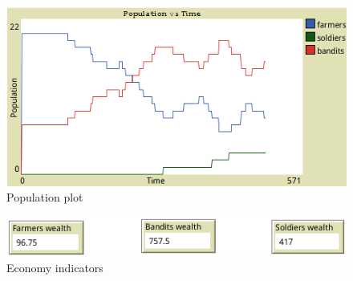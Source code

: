 \documentclass{wscpaperproc}
\begin{document}
\begin{figure}[h!]
    \centering
    \includegraphics[scale=0.5]{Images/Population1}
    \caption{Population plot}
    \label{population_plot1}
\end{figure}

\begin{figure}[h!]
    \centering
    \includegraphics[scale=0.5]{Images/Economy1}
    \caption{Economy indicators}
    \label{economy1}
\end{figure}



\end{document}
